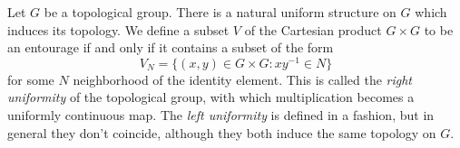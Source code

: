 \documentclass[12pt]{article}
\begin{document}
Let $G$ be a topological group. There is a natural uniform structure on $G$ which induces its topology. We define a subset $V$ of the Cartesian product $G \times G$ to be an entourage if and only if it contains a subset of the form
\[ V_N = \{ (x,y) \in G \times G : xy^{-1} \in N \} \]
for some $N$ neighborhood of the identity element. This is called the \emph{right uniformity} of the topological group, with which  multiplication becomes a uniformly continuous map.
The \emph{left uniformity} is defined in a  fashion, but in general they don't coincide, although they both induce the same topology on $G$.
\end{document}
